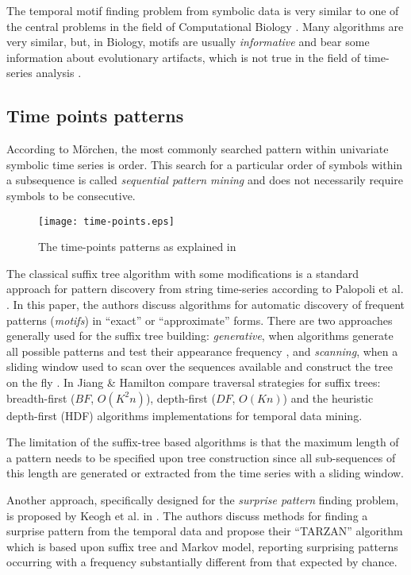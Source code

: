 The temporal motif finding problem from symbolic data is very similar to one of the central problems in the field of Computational Biology \cite{citeulike:465665}. Many algorithms are very similar, but, in Biology, motifs are usually \textit{informative} and bear some information about evolutionary artifacts, which is not true in the field of time-series analysis \cite{citeulike:3978085}.

\subsection{Time points patterns}
According to M\"orchen, the most commonly searched pattern within univariate symbolic time series is order. This search for a particular order of symbols within a subsequence is called \textit{sequential pattern mining} \cite{citeulike:775528} and does not necessarily require symbols to be consecutive.

\begin{figure}[tbp]
   \centering
   \texttt{[image: time-points.eps]}
   \caption{The time-points patterns as explained in \cite{citeulike:1748833}}
   \label{fig:timepoints}
\end{figure}

The classical suffix tree algorithm \cite{citeulike:707616} with some modifications is a standard approach for pattern discovery from string time-series according to Palopoli et al. \cite{citeulike:5003338}. In this paper, the authors discuss algorithms for automatic discovery of frequent patterns (\textit{motifs}) in ``exact'' or ``approximate'' forms. There are two approaches generally used for the suffix tree building: \textit{generative}, when algorithms generate all possible patterns and test their appearance frequency \cite{citeulike:5012661}, and \textit{scanning}, when a sliding window used to scan over the sequences available and construct the tree on the fly \cite{citeulike:5012661}. In \cite{citeulike:5003404} Jiang \& Hamilton compare traversal strategies for suffix trees: breadth-first ($BF$, $O(K^{2}n)$), depth-first ($DF$, $O(Kn)$) and the heuristic depth-first (HDF) algorithms implementations for temporal data mining.

The limitation of the suffix-tree based algorithms is that the maximum length of a pattern needs to be specified upon tree construction since all sub-sequences of this length are generated or extracted from the time series with a sliding window.

Another approach, specifically designed for the \textit{surprise pattern} finding problem, is proposed by Keogh et al. in \cite{citeulike:3025877}. The authors discuss methods for finding a surprise pattern from the temporal data and propose their ``TARZAN'' algorithm which is based upon suffix tree and Markov model, reporting surprising patterns occurring with a frequency substantially different from that expected by chance.

